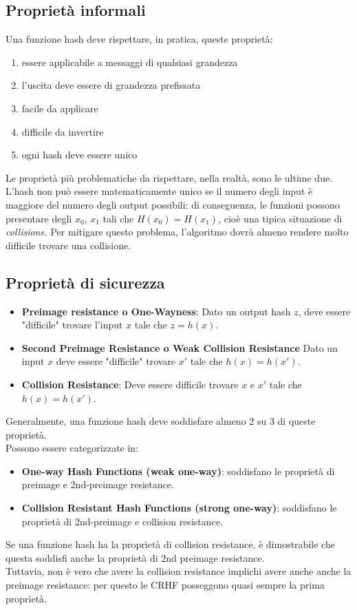 \documentclass[a4paper,12pt]{article}
\begin{document}
\subsection{Proprietà informali}
Una funzione hash deve rispettare, in pratica, queste proprietà:
\begin{enumerate}
	\item essere applicabile a messaggi di qualsiasi grandezza
	\item l'uscita deve essere di grandezza prefissata
	\item facile da applicare
	\item difficile da invertire
	\item ogni hash deve essere unico
\end{enumerate}
Le proprietà più problematiche da rispettare, nella realtà, sono le ultime due. L'hash non può essere matematicamente unico se il numero degli input è maggiore del numero degli output possibili:
di conseguenza, le funzioni possono presentare degli $x_0$, $x_1$ tali che $H(x_0) = H(x_1)$, cioè una tipica situazione di \textit{collisione}. 
Per mitigare questo problema, l'algoritmo dovrà almeno rendere molto difficile trovare una collisione.

\subsection{Proprietà di sicurezza}
\begin{itemize}
	\item \textbf{Preimage resistance o One-Wayness}: Dato un output hash $z$, deve essere "difficile" trovare l'input $x$ tale che $z = h(x)$.
	\item \textbf{Second Preimage Resistance o Weak Collision Resistance} Dato un input $x$ deve essere "difficile" trovare $x'$ tale che $h(x) = h(x')$.
	\item \textbf{Collision Resistance}: Deve essere difficile trovare $x$ e $x'$ tale che $h(x) = h(x')$.
\end{itemize}
Generalmente, una funzione hash deve soddisfare almeno 2 su 3 di queste proprietà. \\
Possono essere categorizzate in:
\begin{itemize}
	\item \textbf{One-way Hash Functions (weak one-way)}: soddisfano le proprietà di preimage e 2nd-preimage resistance.
	\item \textbf{Collision Resistant Hash Functions (strong one-way)}: soddisfano le proprietà di 2nd-preimage e collision resistance.
\end{itemize}
Se una funzione hash ha la proprietà di collision resistance, è dimostrabile che questa soddisfi anche la proprietà di 2nd preimage resistance. \\
Tuttavia, non è vero che avere la collision resistance implichi avere anche anche la preimage resistance: per questo le CRHF posseggono quasi sempre la prima proprietà.
\end{document}
